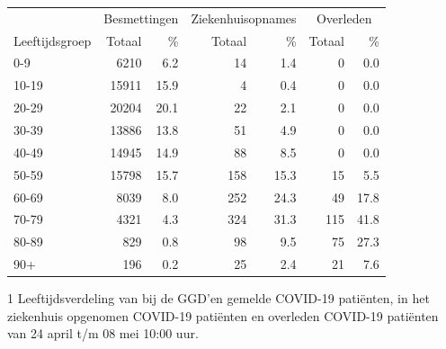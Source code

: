 \documentclass[
  english,
  man,floatsintext]{apa6}
\begin{document}
\begin{table}
\centering\begingroup\fontsize{11}{13}\selectfont

\begin{threeparttable}
\begin{tabular}{lrrrrrr}
\toprule
\multicolumn{1}{c}{ } & \multicolumn{2}{c}{Besmettingen} & \multicolumn{2}{c}{Ziekenhuisopnames} & \multicolumn{2}{c}{Overleden} \\
\cmidrule(l{3pt}r{3pt}){2-3} \cmidrule(l{3pt}r{3pt}){4-5} \cmidrule(l{3pt}r{3pt}){6-7}
Leeftijdsgroep & Totaal & \% & Totaal & \% & Totaal & \%\\
\midrule
0-9 & 6210 & 6.2 & 14 & 1.4 & 0 & 0.0\\
10-19 & 15911 & 15.9 & 4 & 0.4 & 0 & 0.0\\
20-29 & 20204 & 20.1 & 22 & 2.1 & 0 & 0.0\\
30-39 & 13886 & 13.8 & 51 & 4.9 & 0 & 0.0\\
40-49 & 14945 & 14.9 & 88 & 8.5 & 0 & 0.0\\
50-59 & 15798 & 15.7 & 158 & 15.3 & 15 & 5.5\\
60-69 & 8039 & 8.0 & 252 & 24.3 & 49 & 17.8\\
70-79 & 4321 & 4.3 & 324 & 31.3 & 115 & 41.8\\
80-89 & 829 & 0.8 & 98 & 9.5 & 75 & 27.3\\
90+ & 196 & 0.2 & 25 & 2.4 & 21 & 7.6\\
\bottomrule
\end{tabular}
\begin{tablenotes}
\item[1] Leeftijdsverdeling van bij de GGD’en gemelde COVID-19 patiënten, in het ziekenhuis opgenomen COVID-19 patiënten en overleden COVID-19 patiënten van 24 april t/m 08 mei 10:00 uur.
\end{tablenotes}
\end{threeparttable}
\endgroup{}
\end{table}

\newpage
\end{document}
